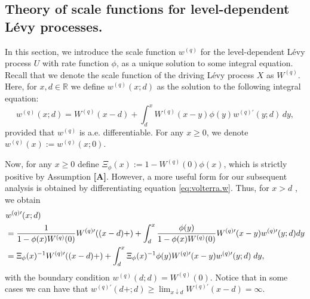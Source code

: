 \documentclass[12pt,reqno]{amsart}
\newcommand{\red}{\textcolor[rgb]{1.00,0.00,0.00}}
\newcommand{\green}{\textcolor[rgb]{0.00,0.70,.30}}
\theoremstyle{definition}
\theoremstyle{remark}
\begin{document}
\subsection{Theory of scale functions for level-dependent L\'evy processes.}\label{ss:integral}

  In this section, we introduce the scale function $w^{(q)}$ for the level-dependent L\'evy process 
$U$ with rate function $\phi$, as a unique solution to some integral equation. Recall that we denote the scale function of the driving L\'evy process $X$ as $W^{(q)}$.
Here, for $x,d\in\mathbb{R}$ we define $w^{(q)}(x;d)$ as the solution to the following integral equation:
  \begin{equation}\label{eq:volterra.w}
    w^{(q)}(x;d)=W^{(q)}(x-d)+\int_d^xW^{(q)}(x-y)\phi(y){w^{(q)\prime}}(y;d)\,dy,%
  \end{equation}
  provided that $ w^{(q)}$ is a.e. differentiable. For any $x\geq0$, we denote $w^{(q)}(x):=w^{(q)}(x;0)$.
	
	Now, for any $x\geq0$ define $\Xi_{\phi}(x):=1-W^{(q)}(0)\phi(x)$, which is strictly positive by Assumption \textbf{[A]}. 
  However, a more useful form for our subsequent analysis is obtained by differentiating equation \eqref{eq:volterra.w}. Thus, for $x > d$ , we obtain 
\begin{align}\label{eq:volterra.w.prime}\notag
  &w^{(q)\prime}(x;d)\\\notag&=\frac{1}{1-\phi(x)W^{(q)}(0)}{W^{(q)\prime}}((x-d)+)+\int_d^x \frac{\phi(y)}{1-\phi(x)W^{(q)}(0)} {W^{(q)\prime}}(x-y){w^{(q)\prime}}(y;d)dy\\
	&=\Xi_{\phi}(x)^{-1} W^{(q)\prime}((x-d)+)+\int_d^x \Xi_{\phi}(x)^{-1} \phi(y) W^{(q)\prime}(x-y){w^{(q)\prime}}(y;d)\;dy, 
\end{align} 
with the boundary condition $w^{(q)}(d;d) = W^{(q)}(0)$. Notice that in some cases we can have that $w^{(q)\prime}(d+;d) \geq \lim_{x\downarrow d}W^{(q)\prime}(x-d)=\infty$. 

\end{document}

